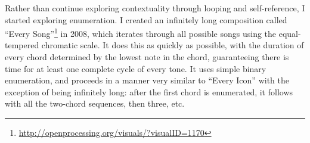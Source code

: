 \documentclass{thesis}
\begin{document}
Rather than continue exploring contextuality through looping and self-reference, I started exploring enumeration. I created an infinitely long composition called ``Every Song''\footnote{\url{http://openprocessing.org/visuals/?visualID=1170}} in 2008, which iterates through all possible songs using the equal-tempered chromatic scale. It does this as quickly as possible, with the duration of every chord determined by the lowest note in the chord, guaranteeing there is time for at least one complete cycle of every tone. It uses simple binary enumeration, and proceeds in a manner very similar to ``Every Icon'' with the exception of being infinitely long: after the first chord is enumerated, it follows with all the two-chord sequences, then three, etc.

\begin{figure}
  \begin{center}

\end{center}
\end{figure}
\end{document}
